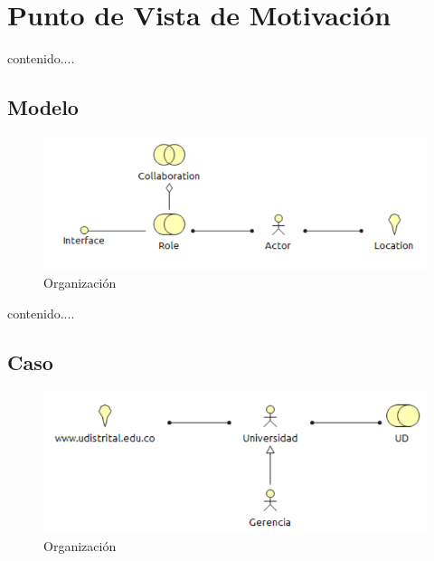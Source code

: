 \section{Punto de Vista de Motivación}
contenido....
\subsection{Modelo}
\begin{figure}[th!]
	\centering
	\includegraphics[width=0.8\linewidth]{arquitectura_diseno/imgs/M_Organizacion}
	\caption{Organización}
\end{figure}
\newpage
contenido....
\subsection{Caso}
\begin{figure}[th!]
	\centering
	\includegraphics[width=0.8\linewidth]{arquitectura_diseno/imgs/C_Organizacion}
	\caption{Organización}
\end{figure}